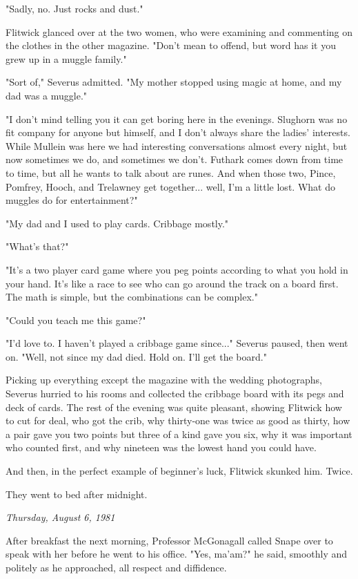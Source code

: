 \documentclass[a4paper,11pt]{article}
\begin{document}
"Sadly, no. Just rocks and dust."

Flitwick glanced over at the two women, who were examining and commenting on the clothes in the other magazine. "Don't mean to offend, but word has it you grew up in a muggle family."

"Sort of," Severus admitted. "My mother stopped using magic at home, and my dad was a muggle."

"I don't mind telling you it can get boring here in the evenings. Slughorn was no fit company for anyone but himself, and I don't always share the ladies' interests. While Mullein was here we had interesting conversations almost every night, but now sometimes we do, and sometimes we don't. Futhark comes down from time to time, but all he wants to talk about are runes. And when those two, Pince, Pomfrey, Hooch, and Trelawney get together... well, I'm a little lost. What do muggles do for entertainment?"

"My dad and I used to play cards. Cribbage mostly."

"What's that?"

"It's a two player card game where you peg points according to what you hold in your hand. It's like a race to see who can go around the track on a board first. The math is simple, but the combinations can be complex."

"Could you teach me this game?"

"I'd love to. I haven't played a cribbage game since..." Severus paused, then went on. "Well, not since my dad died. Hold on. I'll get the board."

Picking up everything except the magazine with the wedding photographs, Severus hurried to his rooms and collected the cribbage board with its pegs and deck of cards. The rest of the evening was quite pleasant, showing Flitwick how to cut for deal, who got the crib, why thirty-one was twice as good as thirty, how a pair gave you two points but three of a kind gave you six, why it was important who counted first, and why nineteen was the lowest hand you could have.

And then, in the perfect example of beginner's luck, Flitwick skunked him. Twice.

They went to bed after midnight.

\emph{Thursday, August 6, 1981}

After breakfast the next morning, Professor McGonagall called Snape over to speak with her before he went to his office. "Yes, ma'am?" he said, smoothly and politely as he approached, all respect and diffidence.
\end{document}
